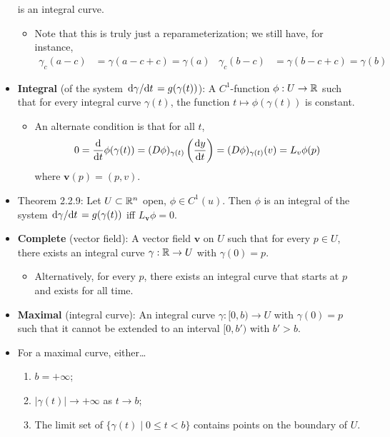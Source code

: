 \documentclass[../notes.tex]{subfiles}
\begin{document}
\begin{itemize}
    is an integral curve.
    \begin{itemize}
        \item Note that this is truly just a reparameterization; we still have, for instance,
        \begin{align*}
            \gamma_c(a-c) &= \gamma(a-c+c) = \gamma(a)&
            \gamma_c(b-c) &= \gamma(b-c+c) = \gamma(b)
        \end{align*}
    \end{itemize}
    \item \textbf{Integral} (of the system $\dv*{\gamma}{t}=g(\gamma(t))$): A $C^1$-function $\phi:U\to\mathbb{R}$ such that for every integral curve $\gamma(t)$, the function $t\mapsto\phi(\gamma(t))$ is constant.
    \begin{itemize}
        \item An alternate condition is that for all $t$,
        \begin{equation*}
            0 = \dv{t}\phi(\gamma(t))
            = (D\phi)_{\gamma(t)}\left( \dv{y}{t} \right)
            = (D\phi)_{\gamma(t)}(v)
            = L_v\phi(p)
        \end{equation*}
        where $\bm{v}(p)=(p,v)$.
    \end{itemize}
    \item Theorem 2.2.9: Let $U\subset\mathbb{R}^n$ open, $\phi\in C^1(u)$. Then $\phi$ is an integral of the system $\dv*{\gamma}{t}=g(\gamma(t))$ iff $L_{\bm{v}}\phi=0$.
    \item \textbf{Complete} (vector field): A vector field $\bm{v}$ on $U$ such that for every $p\in U$, there exists an integral curve $\gamma:\mathbb{R}\to U$ with $\gamma(0)=p$.
    \begin{itemize}
        \item Alternatively, for every $p$, there exists an integral curve that starts at $p$ and exists for all time.
    \end{itemize}
    \item \textbf{Maximal} (integral curve): An integral curve $\gamma:[0,b)\to U$ with $\gamma(0)=p$ such that it cannot be extended to an interval $[0,b')$ with $b'>b$.
    \item For a maximal curve, either\dots
    \begin{enumerate}
        \item $b=+\infty$;
        \item $|\gamma(t)|\to +\infty$ as $t\to b$;
        \item The limit set of $\{\gamma(t)\mid 0\leq t<b\}$ contains points on the boundary of $U$.

\end{enumerate}
\end{itemize}
\end{document}
